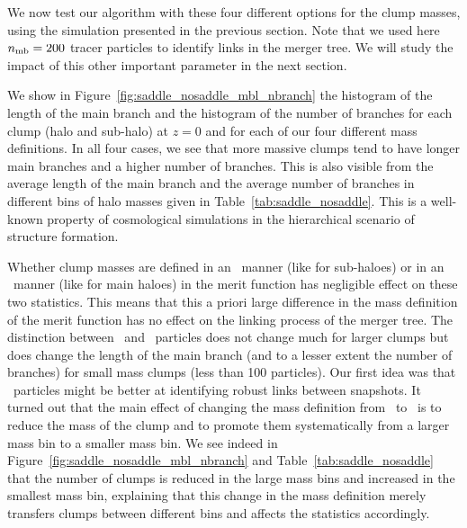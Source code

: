 We now test our algorithm with these four different options for the clump
masses, using the simulation presented in the previous section. Note
that we used here $n_{\rm mb}=200$ tracer particles to identify links
in the merger tree. We will study the impact of this other important
parameter in the next section.

We show in Figure~\ref{fig:saddle_nosaddle_mbl_nbranch} the histogram
of the length of the main branch and the histogram of the number of
branches for each clump (halo and sub-halo) at $z=0$ and for each of
our four different mass definitions. In all four cases, we see that more
massive clumps tend to have longer main branches and a higher number
of branches.  This is also visible from the average length of the main
branch and the average number of branches in different bins of halo
masses given in Table~\ref{tab:saddle_nosaddle}. This is a well-known
property of cosmological simulations in the hierarchical scenario of
structure formation.

Whether clump masses are defined in an \exc\ manner (like for
sub-haloes) or in an \inc\ manner (like for main haloes) in the merit
function has negligible effect on these two statistics. This means
that this a priori large difference in the mass definition of the
merit function has no effect on the linking process of the merger
tree.  The distinction between \sad\ and \nosad\ particles does not
change much for larger clumps but does change the length of the main
branch (and to a lesser extent the number of branches) for small mass
clumps (less than 100 particles). Our first idea was that
\sad\ particles might be better at identifying robust links between
snapshots. It turned out that the main effect of changing the mass
definition from \nosad\ to \sad\ is to reduce the mass of the clump and
to promote them systematically from a larger mass bin to a smaller
mass bin. We see indeed in
Figure~\ref{fig:saddle_nosaddle_mbl_nbranch} and
Table~\ref{tab:saddle_nosaddle} that the number of clumps is reduced
in the large mass bins and increased in the smallest mass bin,
explaining that this change in the mass definition merely transfers clumps
between different bins and affects the statistics accordingly.

